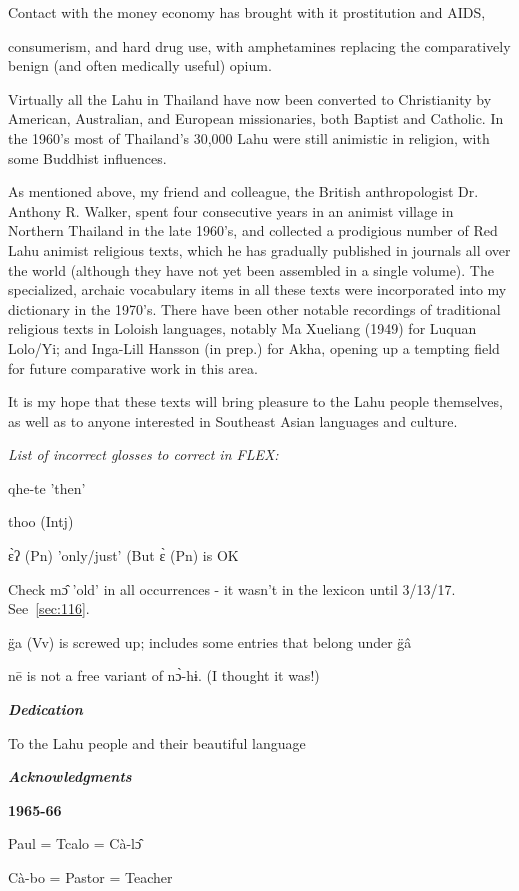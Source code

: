 \begin{itemize}
Contact with the money economy has brought with it prostitution and
AIDS,

consumerism, and hard drug use, with amphetamines replacing the
comparatively benign (and often medically useful) opium.

Virtually all the Lahu in Thailand have now been converted to
Christianity by American, Australian, and European missionaries, both
Baptist and Catholic. In the 1960's most of Thailand's 30,000 Lahu were
still animistic in religion, with some Buddhist influences.

As mentioned above, my friend and colleague, the British anthropologist
Dr. Anthony R. Walker, spent four consecutive years in an animist
village in Northern Thailand in the late 1960's, and collected a
prodigious number of Red Lahu animist religious texts, which he has
gradually published in journals all over the world (although they have
not yet been assembled in a single volume). The specialized, archaic
vocabulary items in all these texts were incorporated into my dictionary
in the 1970's. There have been other notable recordings of traditional
religious texts in Loloish languages, notably Ma Xueliang (1949) for
Luquan Lolo/Yi; and Inga-Lill Hansson (in prep.) for Akha, opening up
a tempting field for future comparative work in this area.

It is my hope that these texts will bring pleasure to the Lahu people
themselves, as well as to anyone interested in Southeast Asian
languages and culture.

\emph{List of incorrect glosses to correct in FLEX:}

qhe-te 'then'

thoo (Intj)

ɛ̀ʔ (Pn) 'only/just' (But ɛ̀ (Pn) is OK

Check mɔ̂ 'old' in all occurrences - it wasn't in the lexicon until
3/13/17. See~\ref{sec:116}.

g̈a (Vv) is screwed up; includes some entries that belong under g̈â

nē is not a free variant of nɔ̀-hɨ. (I thought it was!)

\emph{\textbf{Dedication}}

To the Lahu people and their beautiful language

\emph{\textbf{Acknowledgments}}

\textbf{1965-66}

Paul = Tcalo = Cà-lɔ̂

Cà-bo = Pastor = Teacher


\end{itemize}
